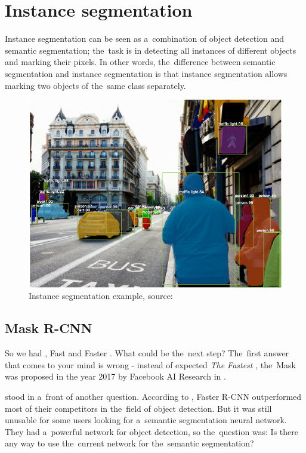 
\section{Instance segmentation}
\label{instance-segmentation}

Instance segmentation can be seen as a~combination of object detection and 
semantic segmentation; the~task is in detecting all instances of different 
objects and marking their pixels. In other words, the~difference between 
semantic segmentation and instance segmentation is that instance segmentation 
allows marking two objects of the~same class separately.

\begin{figure}[H]
   \centering
	\includegraphics[width=0.8\linewidth]{./pictures/instance-segmentation.png}
	\caption[Instance segmentation example]{Instance segmentation example, source: 
\cite{mask-rcnn}}
      \label{fig:instance-segmentation}
\end{figure}

\subsection{Mask R-CNN}
\label{mask-rcnn}

So we had , Fast  and Faster . What could be
the~next step? The~first answer that comes to your mind is wrong - instead of 
expected \textit{The Fastest }, the~Mask  was proposed in 
the year 2017 by Facebook AI Research  in \cite{mask-rcnn}.

 stood in a~front of another question. According to \cite{faster-rcnn}, 
Faster R-CNN outperformed most of their competitors in the~field of object 
detection. But it was still unusable for some users looking for a~semantic 
segmentation neural network. They had a~powerful network for object detection, 
so the~question was: Is there any way to use the~current network for
the~semantic segmentation?

